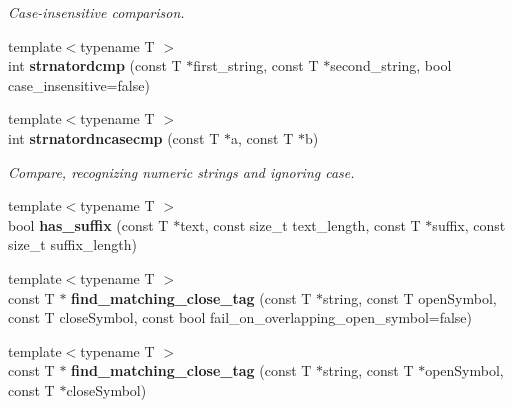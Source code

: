 \begin{DoxyCompactItemize}
\begin{DoxyCompactList}\small\item\em Case-\/insensitive comparison. \end{DoxyCompactList}\item 
{\footnotesize template$<$typename T $>$ }\\int {\bf strnatordcmp} (const T $\ast$first\+\_\+string, const T $\ast$second\+\_\+string, bool case\+\_\+insensitive=false)
\item 
{\footnotesize template$<$typename T $>$ }\\int {\bf strnatordncasecmp} (const T $\ast$a, const T $\ast$b)\label{namespacestring__util_abde462ee1fa10e25dee2010cc9b3d500}

\begin{DoxyCompactList}\small\item\em Compare, recognizing numeric strings and ignoring case. \end{DoxyCompactList}\item 
{\footnotesize template$<$typename T $>$ }\\bool {\bf has\+\_\+suffix} (const T $\ast$text, const size\+\_\+t text\+\_\+length, const T $\ast$suffix, const size\+\_\+t suffix\+\_\+length)
\item 
{\footnotesize template$<$typename T $>$ }\\const T $\ast$ {\bf find\+\_\+matching\+\_\+close\+\_\+tag} (const T $\ast$string, const T open\+Symbol, const T close\+Symbol, const bool fail\+\_\+on\+\_\+overlapping\+\_\+open\+\_\+symbol=false)
\item 
{\footnotesize template$<$typename T $>$ }\\const T $\ast$ {\bf find\+\_\+matching\+\_\+close\+\_\+tag} (const T $\ast$string, const T $\ast$open\+Symbol, const T $\ast$close\+Symbol)\label{namespacestring__util_aca49ee9759c52a930b15816f643f1085}


\end{DoxyCompactItemize}
